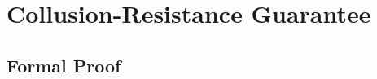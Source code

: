 \documentclass{article}
\newtheorem{theorem}{Theorem}[section]
\begin{document}


\newpage
\printglossaries
\newpage
\printbibliography[heading=bibintoc]
\newpage

\appendix

\section{Collusion-Resistance Guarantee}

\subsection{Formal Proof}
\label{app:collusion_proof}


\end{document}
